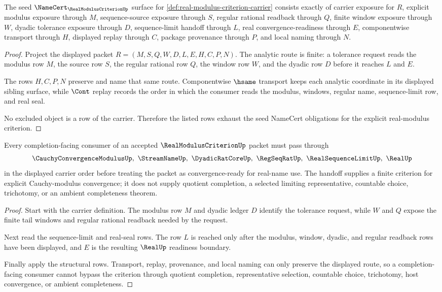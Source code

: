 \begin{theorem}
\label{thm:real-modulus-criterion-namecert-obligations}
The seed $\NameCert_{\RealModulusCriterionUp}$ surface for \autoref{def:real-modulus-criterion-carrier} consists exactly of carrier exposure for $R$, explicit modulus exposure through $M$, sequence-source exposure through $S$, regular rational readback through $Q$, finite window exposure through $W$, dyadic tolerance exposure through $D$, sequence-limit handoff through $L$, real convergence-readiness through $E$, componentwise transport through $H$, displayed replay through $C$, package provenance through $P$, and local naming through $N$.
\end{theorem}
\begin{proof}
Project the displayed packet $R=(M,S,Q,W,D,L,E,H,C,P,N)$. The analytic route is finite: a tolerance request reads the modulus row $M$, the source row $S$, the regular rational row $Q$, the window row $W$, and the dyadic row $D$ before it reaches $L$ and $E$.

The rows $H,C,P,N$ preserve and name that same route. Componentwise $\hsame$ transport keeps each analytic coordinate in its displayed sibling surface, while $\Cont$ replay records the order in which the consumer reads the modulus, windows, regular name, sequence-limit row, and real seal.

No excluded object is a row of the carrier. Therefore the listed rows exhaust the seed NameCert obligations for the explicit real-modulus criterion.
\end{proof}

\begin{theorem}
\label{thm:real-modulus-criterion-completion-handoff}
Every completion-facing consumer of an accepted $\RealModulusCriterionUp$ packet must pass through
$$
\CauchyConvergenceModulusUp,\ \StreamNameUp,\ \DyadicRatCoreUp,\ \RegSeqRatUp,\ \RealSequenceLimitUp,\ \RealUp
$$
in the displayed carrier order before treating the packet as convergence-ready for real-name use. The handoff supplies a finite criterion for explicit Cauchy-modulus convergence; it does not supply quotient completion, a selected limiting representative, countable choice, trichotomy, or an ambient completeness theorem.
\end{theorem}
\begin{proof}
Start with the carrier definition. The modulus row $M$ and dyadic ledger $D$ identify the tolerance request, while $W$ and $Q$ expose the finite tail windows and regular rational readback needed by the request.

Next read the sequence-limit and real-seal rows. The row $L$ is reached only after the modulus, window, dyadic, and regular readback rows have been displayed, and $E$ is the resulting $\RealUp$ readiness boundary.

Finally apply the structural rows. Transport, replay, provenance, and local naming can only preserve the displayed route, so a completion-facing consumer cannot bypass the criterion through quotient completion, representative selection, countable choice, trichotomy, host convergence, or ambient completeness.
\end{proof}

